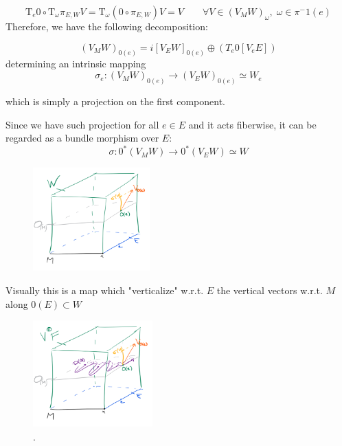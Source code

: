 \documentclass[a4paper,12pt]{scrartcl}  %
\begin{document}
\begin{displaymath}
	\textrm{T}_e 0 \circ \textrm{T}_\omega \pi_{E,W} V =
	\textrm{T}_\omega \left( 0 \circ \pi_{E,W} \right) V = 
	V \qquad \forall V \in \left( V_M W \right)_\omega ,\; \omega \in \pi^-1(e)
\end{displaymath}
Therefore, we have the following decomposition:

\begin{displaymath}
	\left( V_M W \right)_{0(e)} = 
	i\left[ V_E W \right]_{0(e)} \oplus \left( T_e 0 \left[ V_e E\right] \right)
\end{displaymath}
determining an intrinsic mapping 
\begin{displaymath}
	\sigma_e : \left( V_M W \right)_{0(e)} \rightarrow \left( V_E W \right)_{0(e)} \simeq W_e
\end{displaymath}

which is simply a  projection on the first component.

Since we have such projection for all $e \in E$ and it acts fiberwise, it can be regarded as a bundle morphism over $E$:
\begin{displaymath}
	\sigma : 0^\ast \left( V_M W \right) \rightarrow 0^\ast \left( V_E W \right) \simeq W
\end{displaymath} 

\begin{figure}
\centering
\includegraphics[width=0.40\textwidth]{Pictures/sigma.png}
\end{figure}
Visually this is a map which "verticalize" w.r.t. $E$ the vertical vectors w.r.t. $M$ along $0(E) \subset W$

\begin{figure}
  \centering
  \includegraphics[width=0.41\textwidth]{Pictures/fieldJacobi.png}
  \caption{.}
\end{figure}
\end{document}
